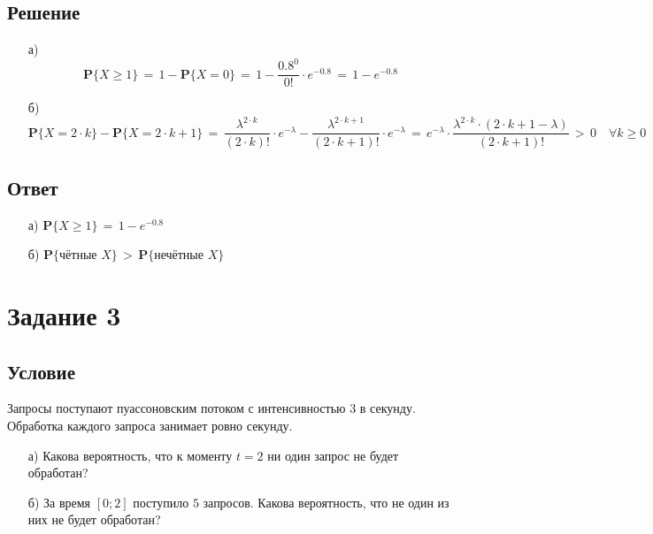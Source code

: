 \documentclass{article}
\begin{document}
\subsection*{Решение}
\begin{enumerate}
\item[а)]
\[ \mathbf{P} \big\{ X \! \geqslant \! 1 \big\} \, = \, 1 \! - \! \mathbf{P} \big\{ X \! = \! 0 \big\} \, = \, 1 \! - \! \dfrac{0.8^0}{0!} \! \cdot \! e^{-0.8} \, = \, 1 \! - \! e^{-0.8}  \]
\item[б)]
\[ \mathbf{P} \big\{ X \! = \! 2 \! \cdot \! k \big\} \! - \! \mathbf{P} \big\{ X \! = \! 2 \! \cdot \! k \! + \! 1 \big\} \, = \, \dfrac{\lambda^{2 \cdot k}}{(2 \! \cdot \! k)!} \! \cdot \! e^{-\lambda} \! - \! \dfrac{\lambda^{2 \cdot k+1}}{(2 \! \cdot \! k \! + \! 1)!} \! \cdot \! e^{-\lambda} \, = \, e^{-\lambda} \! \cdot \! \dfrac{\lambda^{2 \cdot k} \! \cdot \! (2 \! \cdot \! k \! + \! 1 \! - \! \lambda)}{(2 \! \cdot \! k \! + \! 1)!} \, > \, 0 \quad \forall k \! \geqslant \! 0 \]
\end{enumerate}
\subsection*{Ответ}
\begin{enumerate}
\item[а)] $ \mathbf{P} \big\{ X \! \geqslant \! 1 \big\} \, = \, 1 \! - \! e^{-0.8} $
\item[б)] $ \mathbf{P} \big\{ \text{чётные } X \big\} \, > \, \mathbf{P} \big\{ \text{нечётные } X \big\} $
\end{enumerate}
\section*{Задание 3}
\subsection*{Условие}
Запросы поступают пуассоновским потоком с интенсивностью $ 3 $ в секунду. Обработка каждого запроса занимает ровно секунду.
\begin{enumerate}
\item[а)] Какова вероятность, что к моменту $ t \! = \! 2 $ ни один запрос не будет обработан?
\item[б)] За время $ [0;2] $ поступило $ 5 $ запросов. Какова вероятность, что не один из них не будет обработан?
\end{enumerate}
\end{document}
